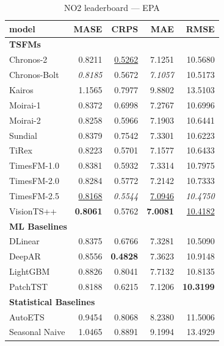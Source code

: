 \begin{table}[H]
\caption{NO2 leaderboard --- EPA}
\centering
\begin{small}
\begin{tabular}{lrrrr}
\toprule
model & MASE & CRPS & MAE & RMSE \\
\midrule
\multicolumn{5}{l}{\textbf{TSFMs}} \\
Chronos-2 & 0.8211 & \underline{0.5262} & 7.1251 & 10.5680 \\
Chronos-Bolt & \textit{0.8185} & 0.5672 & \textit{7.1057} & 10.5173 \\
Kairos & 1.1565 & 0.7977 & 9.8802 & 13.5103 \\
Moirai-1 & 0.8372 & 0.6998 & 7.2767 & 10.6996 \\
Moirai-2 & 0.8258 & 0.5966 & 7.1903 & 10.6441 \\
Sundial & 0.8379 & 0.7542 & 7.3301 & 10.6223 \\
TiRex & 0.8223 & 0.5701 & 7.1577 & 10.6433 \\
TimesFM-1.0 & 0.8381 & 0.5932 & 7.3314 & 10.7975 \\
TimesFM-2.0 & 0.8284 & 0.5772 & 7.2142 & 10.7333 \\
TimesFM-2.5 & \underline{0.8168} & \textit{0.5544} & \underline{7.0946} & \textit{10.4750} \\
VisionTS++ & \textbf{0.8061} & 0.5762 & \textbf{7.0081} & \underline{10.4182} \\
\midrule
\multicolumn{5}{l}{\textbf{ML Baselines}} \\
DLinear & 0.8375 & 0.6766 & 7.3281 & 10.5090 \\
DeepAR & 0.8556 & \textbf{0.4828} & 7.3623 & 10.9148 \\
LightGBM & 0.8826 & 0.8041 & 7.7132 & 10.8135 \\
PatchTST & 0.8188 & 0.6215 & 7.1206 & \textbf{10.3199} \\
\midrule
\multicolumn{5}{l}{\textbf{Statistical Baselines}} \\
AutoETS & 0.9454 & 0.8068 & 8.2380 & 11.5006 \\
Seasonal Naive & 1.0465 & 0.8891 & 9.1994 & 13.4929 \\
\bottomrule
\end{tabular}
\end{small}
\end{table}